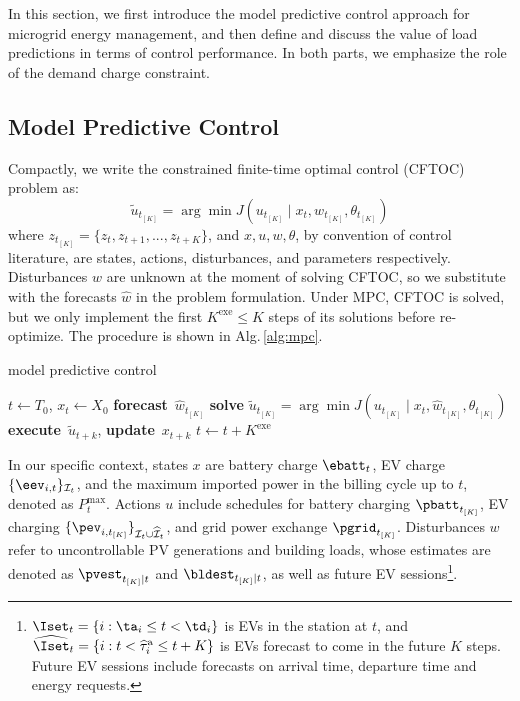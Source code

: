 \newcommand{\tToK}{t_{[K]}}
\newcommand{\pgridSch}{\widetilde{p}^{\text{G}}}
\newcommand{\pbattSch}{\widetilde{p}^{\text{B}}}
\newcommand{\pevSch}{\widetilde{p}^{\text{EV}}}
\newcommand{\prevmax}{P^{\max}}
\newcommand{\prevmaxNecc}{\widetilde{P}^{\max}}


In this section, we first introduce the model predictive control approach for microgrid energy management, and then define and discuss the value of load predictions in terms of control performance. In both parts, we emphasize the role of the demand charge constraint.

\subsection{Model Predictive Control}

Compactly, we write the constrained finite-time optimal control (CFTOC) problem as:
\begin{equation}
    \widetilde{u}_{t_{[K]}} = \arg\min J(u_{t_{[K]}} \mid x_t, w_{t_{[K]}}, \theta_{t_{[K]}})
\end{equation}
where $z_{t_{[K]}} = \{z_t, z_{t+1}, ..., z_{t+K}\}$, and $x, u, w, \theta$, by convention of control literature, are states, actions, disturbances, and parameters respectively. Disturbances $w$ are unknown at the moment of solving CFTOC, so we substitute with the forecasts $\hat{w}$ in the problem formulation. Under MPC, CFTOC is solved, but we only implement the first $K^\text{exe} \le K$ steps of its solutions before re-optimize. The procedure is shown in Alg.\,\ref{alg:mpc}.  
\begin{algorithm}
\caption{model predictive control}\label{alg:mpc}
\begin{algorithmic}
\STATE $t \gets T_0$, $x_t \gets X_0$
\STATE \textbf{forecast}~$\widehat{w}_{t_{[K]}}$
\STATE \textbf{solve} $\widetilde{u}_{t_{[K]}} = \arg\min J(u_{t_{[K]}} \mid x_t, \widehat{w}_{t_{[K]}}, \theta_{t_{[K]}})$
    \STATE \textbf{execute}~$\widetilde{u}_{t+k}$, \textbf{update}~$x_{t+k}$
\ENDFOR
\STATE $t \gets t + K^\text{exe}$
\ENDWHILE
\end{algorithmic}
\end{algorithm}

In our specific context, states $x$ are battery charge $\ebatt_t$, EV charge $\{\eev_{i,t}\}_{\mathcal{I}_t}$, and the maximum imported power in the billing cycle up to $t$, denoted as $\prevmax_t$. Actions $u$ include schedules for battery charging $\pbatt_{t_{[K]}}$, EV charging $\{\pev_{i, \tToK}\}_{\mathcal{I}_t \cup \widehat{\mathcal{I}}_t}$, and grid power exchange $\pgrid_{\tToK}$. Disturbances $w$ refer to uncontrollable PV generations and building loads, whose estimates are denoted as $\pvest_{\tToK \mid t}$ and $\bldest_{\tToK \mid t}$, as well as future EV sessions\footnote{$\Iset_t = \{i: \ta_i \le t < \td_i\}$ is EVs in the station at $t$, and $\widehat{\Iset}_t=\{i: t < \widehat{\tau}^\text{a}_i \le t+K\}$ is EVs forecast to come in the future $K$ steps. Future EV sessions include forecasts on arrival time, departure time and energy requests.}.

